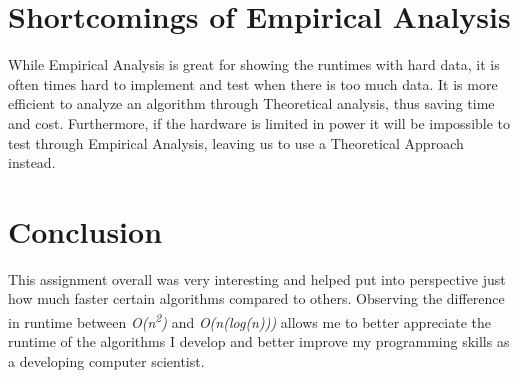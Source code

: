 \documentclass[conference]{IEEEtran}
\begin{document}
\section{Shortcomings of Empirical Analysis}
While Empirical Analysis is great for showing the runtimes with hard data, it is often times hard to implement and test when there is too much data. It is more efficient to analyze an algorithm through Theoretical analysis, thus saving time and cost. Furthermore, if the hardware is limited in power it will be impossible to test through Empirical Analysis, leaving us to use a Theoretical Approach instead.

\section{Conclusion}
This assignment overall was very interesting and helped put into perspective just how much faster certain algorithms compared to others. Observing the difference in runtime between \textit{O(n\textsuperscript{2})} and \textit{O(n(log(n)))} allows me to better appreciate the runtime of the algorithms I develop and better improve my programming skills as a developing computer scientist.
\end{document}
